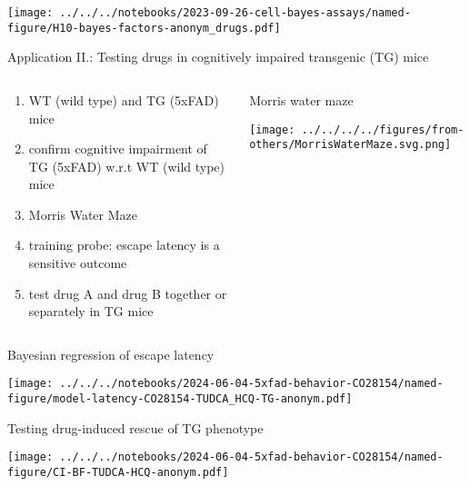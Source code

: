 \documentclass[aspectratio=169]{beamer}
\begin{document}
\begin{frame}{}
  \texttt{[image: ../../../notebooks/2023-09-26-cell-bayes-assays/named-figure/H10-bayes-factors-anonym\_drugs.pdf]}
\end{frame}

\begin{frame}{Application II.: Testing drugs in cognitively impaired transgenic (TG) mice}
  \small
\begin{columns}[t]
\begin{column}{0.5\textwidth}
\begin{enumerate}
  \item WT (wild type) and TG (5xFAD) mice
  \item confirm cognitive impairment of TG (5xFAD) w.r.t WT (wild type) mice
  \item Morris Water Maze
  \item training probe: \alert{escape latency} is a sensitive outcome
  \item test drug A and drug B together or separately in TG mice
\end{enumerate}
\end{column}

\begin{column}{0.5\textwidth}
  Morris water maze

\texttt{[image: ../../../../figures/from-others/MorrisWaterMaze.svg.png]}
\end{column}
\end{columns}
\end{frame}

\begin{frame}{Bayesian regression of escape latency}

  \begin{center}
  \texttt{[image: ../../../notebooks/2024-06-04-5xfad-behavior-CO28154/named-figure/model-latency-CO28154-TUDCA\_HCQ-TG-anonym.pdf]}
  \end{center}
\end{frame}

\begin{frame}{Testing drug-induced rescue of TG phenotype}

  \begin{center}
  \texttt{[image: ../../../notebooks/2024-06-04-5xfad-behavior-CO28154/named-figure/CI-BF-TUDCA-HCQ-anonym.pdf]}
  \end{center}
\end{frame}
\end{document}
